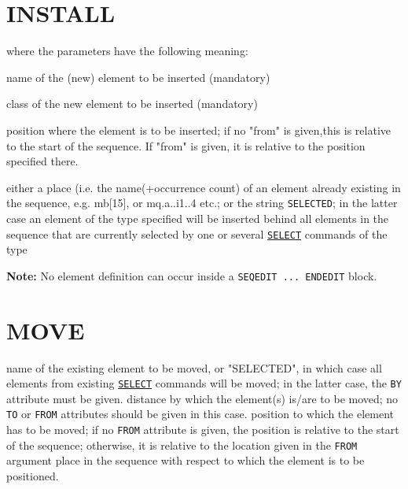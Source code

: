 \section{INSTALL}
\label{sec:install}
where the parameters have the following meaning: 
\begin{madlist}
    name of the (new) element to be inserted (mandatory) 

    class of the new element to be inserted (mandatory) 

    position where the element is to be inserted; if no "from"
     is given,this is relative to the start of the sequence. If "from"
     is given, it is relative to the position specified there. 

    either a place (i.e. the name(+occurrence count) of an
     element already existing in the sequence, e.g. mb[15], or
     mq.a..i1..4 etc.; or the string \texttt{SELECTED}; in the latter
     case an element of the type specified will be inserted behind all
     elements in the sequence that are currently selected by one or several
     \hyperref[sec:select]{\texttt{SELECT}} commands of the type 
\end{madlist}

\textbf{Note:} No element definition can occur inside a \texttt{SEQEDIT
  ... ENDEDIT} block.


\section{MOVE}
\label{sec:move}
\begin{madlist}
   name of the existing element to be moved, or
  "SELECTED", in which case all elements from existing
  \hyperref[sec:select]{\texttt{SELECT}} commands will be moved;
  in the latter case, the \texttt{BY} attribute must be given.  
   distance by which the element(s) is/are to be moved; no
  \texttt{TO} or \texttt{FROM} attributes should be given in this case.  
   position to which the element has to be moved; if no
  \texttt{FROM} attribute is given, the position is relative to the
  start of the sequence; otherwise, it is relative to the location
  given in the \texttt{FROM} argument   
   place in the sequence with respect to which the element
  is to be positioned.  
\end{madlist}

